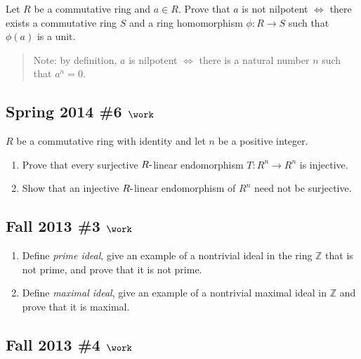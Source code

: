 Let \(R\) be a commutative ring and \(a\in R\). Prove that \(a\) is not
nilpotent \(\iff\) there exists a commutative ring \(S\) and a ring
homomorphism \(\phi: R\to S\) such that \(\phi(a)\) is a unit.

\begin{quote}
Note: by definition, \(a\) is nilpotent \(\iff\) there is a natural
number \(n\) such that \(a^n = 0\).
\end{quote}

\hypertarget{spring-2014-6-work}{%
\subsection{\texorpdfstring{Spring 2014 \#6
\(\work\)}{Spring 2014 \#6 \textbackslash work}}\label{spring-2014-6-work}}

\(R\) be a commutative ring with identity and let \(n\) be a positive
integer.

\begin{enumerate}
\def\labelenumi{\alph{enumi}.}
\item
  Prove that every surjective \(R{\hbox{-}}\)linear endomorphism
  \(T: R^n \to R^n\) is injective.
\item
  Show that an injective \(R{\hbox{-}}\)linear endomorphism of \(R^n\)
  need not be surjective.
\end{enumerate}

\hypertarget{fall-2013-3-work}{%
\subsection{\texorpdfstring{Fall 2013 \#3
\(\work\)}{Fall 2013 \#3 \textbackslash work}}\label{fall-2013-3-work}}

\begin{enumerate}
\def\labelenumi{\alph{enumi}.}
\item
  Define \emph{prime ideal}, give an example of a nontrivial ideal in
  the ring \({\mathbb{Z}}\) that is not prime, and prove that it is not
  prime.
\item
  Define \emph{maximal ideal}, give an example of a nontrivial maximal
  ideal in \({\mathbb{Z}}\) and prove that it is maximal.
\end{enumerate}

\hypertarget{fall-2013-4-work}{%
\subsection{\texorpdfstring{Fall 2013 \#4
\(\work\)}{Fall 2013 \#4 \textbackslash work}}\label{fall-2013-4-work}}


